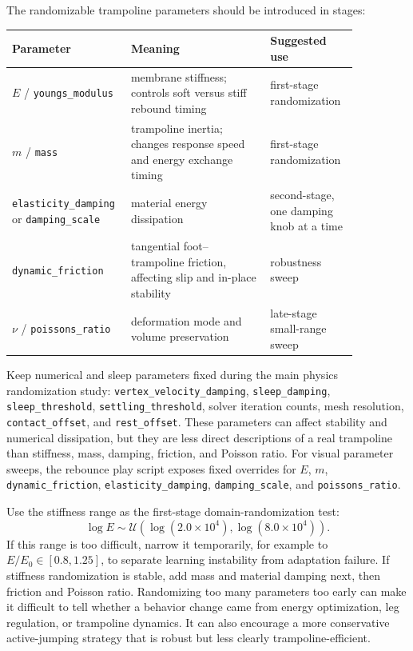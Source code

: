 \documentclass[11pt, a4paper]{article}
\begin{document}
The randomizable trampoline parameters should be introduced in stages:
\begin{center}
\small
\begin{tabular}{p{0.24\linewidth}p{0.38\linewidth}p{0.24\linewidth}}
\hline
Parameter & Meaning & Suggested use \\
\hline
$E$ / \texttt{youngs\_modulus} & membrane stiffness; controls soft versus
stiff rebound timing & first-stage randomization \\
$m$ / \texttt{mass} & trampoline inertia; changes response speed and energy
exchange timing & first-stage randomization \\
\texttt{elasticity\_damping} or \texttt{damping\_scale} & material energy
dissipation & second-stage, one damping knob at a time \\
\texttt{dynamic\_friction} & tangential foot--trampoline friction, affecting
slip and in-place stability & robustness sweep \\
$\nu$ / \texttt{poissons\_ratio} & deformation mode and volume preservation &
late-stage small-range sweep \\
\hline
\end{tabular}
\end{center}

Keep numerical and sleep parameters fixed during the main physics
randomization study: \texttt{vertex\_velocity\_damping},
\texttt{sleep\_damping}, \texttt{sleep\_threshold},
\texttt{settling\_threshold}, solver iteration counts, mesh resolution,
\texttt{contact\_offset}, and \texttt{rest\_offset}. These parameters can affect
stability and numerical dissipation, but they are less direct descriptions of a
real trampoline than stiffness, mass, damping, friction, and Poisson ratio.
For visual parameter sweeps, the rebounce play script exposes fixed overrides
for $E$, $m$, \texttt{dynamic\_friction},
\texttt{elasticity\_damping}, \texttt{damping\_scale}, and
\texttt{poissons\_ratio}.

Use the stiffness range as the first-stage domain-randomization test:
\[
    \log E \sim \mathcal{U}(\log(2.0\times10^4),\log(8.0\times10^4)).
\]
If this range is too difficult, narrow it temporarily, for example to
$E/E_0\in[0.8,1.25]$, to separate learning instability from adaptation
failure. If stiffness randomization is stable, add mass and material damping
next, then friction and Poisson ratio. Randomizing too many parameters too
early can make it difficult to tell whether a behavior change came from energy
optimization, leg regulation, or trampoline dynamics. It can also encourage a
more conservative active-jumping strategy that is robust but less clearly
trampoline-efficient.
\end{document}
